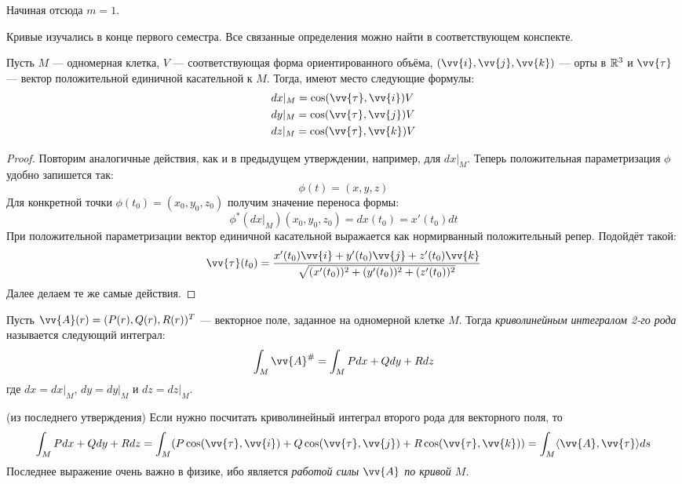 \begin{note}
	Начиная отсюда $m = 1$.
\end{note}

\begin{reminder}
	Кривые изучались в конце первого семестра. Все связанные определения можно найти в соответствующем конспекте.
\end{reminder}

\begin{proposition}
	Пусть $M$ --- одномерная клетка, $V$ --- соответствующая форма ориентированного объёма, $(\vv{i}, \vv{j}, \vv{k})$ --- орты в $\mathbb{R}^3$ и $\vv{\tau}$ --- вектор положительной единичной касательной к $M$. Тогда, имеют место следующие формулы:
	\begin{align*}
		&{dx|_M = \cos(\vv{\tau}, \vv{i})V}
		\\
		&{dy|_M = \cos(\vv{\tau}, \vv{j})V}
		\\
		&{dz|_M = \cos(\vv{\tau}, \vv{k})V}
	\end{align*}
\end{proposition}

\begin{proof}
	Повторим аналогичные действия, как и в предыдущем утверждении, например, для $dx|_M$. Теперь положительная параметризация $\phi$ удобно запишется так:
	\[
		\phi(t) = (x, y, z)
	\]
	Для конкретной точки $\phi(t_0) = (x_0, y_0, z_0)$ получим значение переноса формы:
	\[
		\phi^*(dx|_M)(x_0, y_0, z_0) = dx(t_0) = x'(t_0)dt
	\]
	При положительной параметризации вектор единичной касательной выражается как нормирванный положительный репер. Подойдёт такой:
	\[
		\vv{\tau}(t_0) = \frac{x'(t_0)\vv{i} + y'(t_0)\vv{j} + z'(t_0)\vv{k}}{\sqrt{(x'(t_0))^2 + (y'(t_0))^2 + (z'(t_0))^2}}
	\]
	Далее делаем те же самые действия.
\end{proof}

\begin{definition}
	Пусть $\vv{A}(r) = (P(r), Q(r), R(r))^T$ --- векторное поле, заданное на одномерной клетке $M$. Тогда \textit{криволинейным интегралом 2-го рода} называется следующий интеграл:
	\[
		\int_M \vv{A}^\# = \int_M Pdx + Qdy + Rdz
	\]
	где $dx = dx|_M$, $dy = dy|_M$ и $dz = dz|_M$.
\end{definition}

\begin{corollary} (из последнего утверждения)
	Если нужно посчитать криволинейный интеграл второго рода для векторного поля, то
	\[
		\int_M Pdx + Qdy + Rdz = \int_M (P\cos(\vv{\tau}, \vv{i}) + Q\cos(\vv{\tau}, \vv{j}) + R\cos(\vv{\tau}, \vv{k})) = \int_M \ntbr{\vv{A}, \vv{\tau}}ds
	\]
	Последнее выражение очень важно в физике, ибо является \textit{работой силы $\vv{A}$ по кривой $M$}.
\end{corollary}

